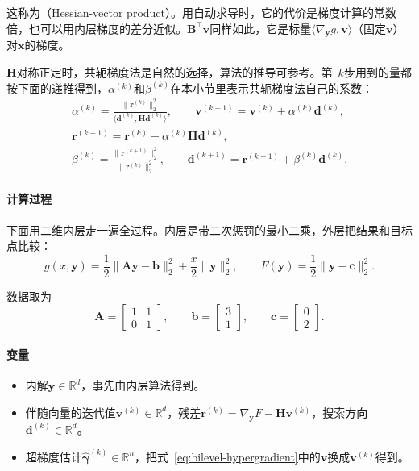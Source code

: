 这称为（Hessian-vector product）。用自动求导时，它的代价是梯度计算的常数倍，也可以用内层梯度的差分近似。$\bm{B}^{\top}\bm{v}$同样如此，它是标量$\langle\nabla_{\bm{y}}g,\bm{v}\rangle$（固定$\bm{v}$）对$\bm{x}$的梯度。

$\bm{H}$对称正定时，共轭梯度法是自然的选择，算法的推导可参考。第~$k$步用到的量都按下面的递推得到，$\alpha^{(k)}$和$\beta^{(k)}$在本小节里表示共轭梯度法自己的系数：
\begin{equation}
 \begin{gathered}
 \alpha^{(k)}=\frac{\lVert\bm{r}^{(k)}\rVert_2^2}{\langle\bm{d}^{(k)},\bm{H}\bm{d}^{(k)}\rangle},\qquad
 \bm{v}^{(k+1)}=\bm{v}^{(k)}+\alpha^{(k)}\bm{d}^{(k)},\\
 \bm{r}^{(k+1)}=\bm{r}^{(k)}-\alpha^{(k)}\bm{H}\bm{d}^{(k)},\\
 \beta^{(k)}=\frac{\lVert\bm{r}^{(k+1)}\rVert_2^2}{\lVert\bm{r}^{(k)}\rVert_2^2},\qquad
 \bm{d}^{(k+1)}=\bm{r}^{(k+1)}+\beta^{(k)}\bm{d}^{(k)}.
 \end{gathered}
 \label{eq:bilevel-cg}
\end{equation}

\paragraph{计算过程}
下面用二维内层走一遍全过程。内层是带二次惩罚的最小二乘，外层把结果和目标点比较：
\[
 g(x,\bm{y})=\frac12\lVert\bm{A}\bm{y}-\bm{b}\rVert_2^2+\frac{x}{2}\lVert\bm{y}\rVert_2^2,\qquad F(\bm{y})=\frac12\lVert\bm{y}-\bm{c}\rVert_2^2.
\]

数据取为
\[
 \bm{A}=\begin{bmatrix}1&1\\0&1\end{bmatrix},\qquad
 \bm{b}=\begin{bmatrix}3\\1\end{bmatrix},\qquad
 \bm{c}=\begin{bmatrix}0\\2\end{bmatrix}.
\]

\paragraph{变量}
\begin{itemize}
 \item 内解$\bm{y}\in\mathbb{R}^d$，事先由内层算法得到。
 \item 伴随向量的迭代值$\bm{v}^{(k)}\in\mathbb{R}^d$，残差$\bm{r}^{(k)}=\nabla_{\bm{y}}F-\bm{H}\bm{v}^{(k)}$，搜索方向$\bm{d}^{(k)}\in\mathbb{R}^d$。
 \item 超梯度估计$\hat{\bm{\gamma}}^{(k)}\in\mathbb{R}^n$，把式~\eqref{eq:bilevel-hypergradient}中的$\bm{v}$换成$\bm{v}^{(k)}$得到。
\end{itemize}

